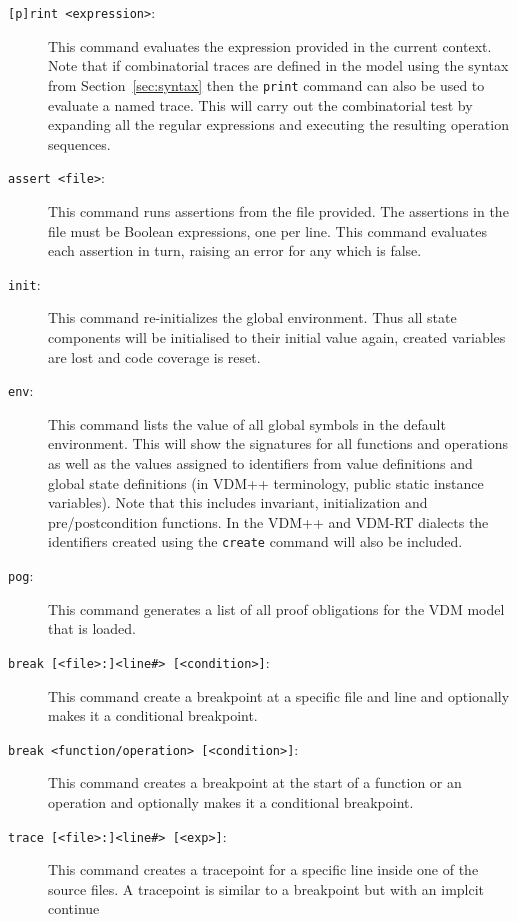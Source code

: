 \documentclass{overturerep}
\begin{document}
{\begin{description}
\item[\texttt{[p]rint <expression>}:] This command evaluates the
  expression provided in the current
  context. Note that if combinatorial traces
  are defined in the model using the syntax from
  Section~\ref{sec:syntax} then the \texttt{print} command can also be
  used to evaluate a named trace. This will carry out the combinatorial
  test by expanding all the regular expressions and executing the resulting
  operation sequences.    
\item[\texttt{assert <file>}:] This command runs assertions from the
  file provided. The assertions in the file must be Boolean
  expressions, one per line. This command evaluates each assertion in
  turn, raising an error for any which is false.  
\item[\texttt{init}:] This command re-initializes the global
  environment. Thus all state components will be initialised to their
  initial value again, created variables are lost and code coverage
  is reset. 
\item[\texttt{env}:] This command lists the value of all global symbols
  in the default environment. This will show the signatures for all
  functions and operations as well as the values assigned to
  identifiers from value definitions and global state definitions (in VDM++
  terminology, public static instance variables). Note that this includes invariant,
  initialization and pre/postcondition functions. In the VDM++ and
  VDM-RT dialects the identifiers created using the \texttt{create}
  command will also be included. 
\item[\texttt{pog}:] This command generates a list of all proof
  obligations for the VDM model that is
  loaded.  
\item[\texttt{break [<file>:]<line\#> [<condition>]}:] This command
  create a breakpoint at a specific file and line and optionally makes
  it a conditional breakpoint.  
\item[\texttt{break <function/operation> [<condition>]}:] This command
  creates a breakpoint at the start of a function or an operation and
  optionally makes it a conditional breakpoint. 
\item[\texttt{trace [<file>:]<line\#> [<exp>]}:] This command creates a
  tracepoint for a specific line inside one of the source files. A
  tracepoint is similar to a breakpoint but with an implcit continue

\end{description}}
\end{document}

